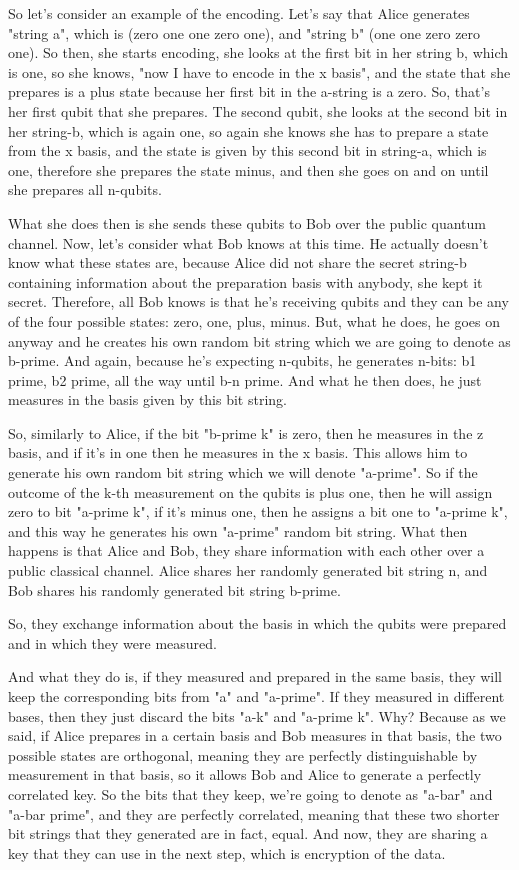 So let's consider an example of the encoding. Let's say that Alice generates "string a", which is (zero one one zero one), and "string b" (one one zero zero one). So then, she starts encoding, she looks at the first bit in her string b, which is one, so she knows, "now I have to encode in the x basis", and the state that she prepares is a plus state because her first bit in the a-string is a zero. So, that's her first qubit that she prepares. The second qubit, she looks at the second bit in her string-b, which is again one, so again she knows she has to prepare a state from the x basis, and the state is given by this second bit in string-a, which is one, therefore she prepares the state minus, and then she goes on and on until she prepares all n-qubits.

What she does then is she sends these qubits to Bob over the public quantum channel. Now, let's consider what Bob knows at this time. He actually doesn't know what these states are, because Alice did not share the secret string-b containing information about the preparation basis with anybody, she kept it secret. Therefore, all Bob knows is that he's receiving qubits and they can be any of the four possible states: zero, one, plus, minus. But, what he does, he goes on anyway and he creates his own random bit string which we are going to denote as b-prime. And again, because he's expecting n-qubits, he generates n-bits: b1 prime, b2 prime, all the way until b-n prime. And what he then does, he just measures in the basis given by this bit string.

So, similarly to Alice, if the bit "b-prime k" is zero, then he measures in the z basis, and if it's in one then he measures in the x basis. This allows him to generate his own random bit string which we will denote "a-prime". So if the outcome of the k-th measurement on the qubits is plus one, then he will assign zero to bit "a-prime k", if it's minus one, then he assigns a bit one to "a-prime k", and this way he generates his own "a-prime" random bit string. What then happens is that Alice and Bob, they share information with each other over a public classical channel. Alice shares her randomly generated bit string n, and Bob shares his randomly generated bit string b-prime.

So, they exchange information about the basis in which the qubits were prepared and in which they were measured.

And what they do is, if they measured and prepared in the same basis, they will keep the corresponding bits from "a" and "a-prime". If they measured in different bases, then they just discard the bits "a-k" and "a-prime k". Why? Because as we said, if Alice prepares in a certain basis and Bob measures in that basis, the two possible states are orthogonal, meaning they are perfectly distinguishable by measurement in that basis, so it allows Bob and Alice to generate a perfectly correlated key. So the bits that they keep, we're going to denote as "a-bar" and "a-bar prime", and they are perfectly correlated, meaning that these two shorter bit strings that they generated are in fact, equal. And now, they are sharing a key that they can use in the next step, which is encryption of the data.

